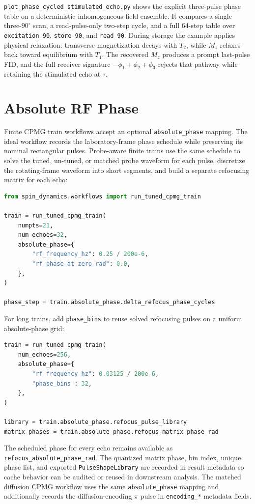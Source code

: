 \documentclass[11pt,oneside]{report}
\newcommand{\code}[1]{\texttt{#1}}
\begin{document}
\code{plot\_phase\_cycled\_stimulated\_echo.py} shows the explicit three-pulse
phase table on a deterministic inhomogeneous-field ensemble. It compares a
single three-\(90^\circ\) scan, a read-pulse-only two-step cycle, and a full
64-step table over \code{excitation\_90}, \code{store\_90}, and
\code{read\_90}. During storage the example applies physical relaxation:
transverse magnetization decays with \(T_2\), while \(M_z\) relaxes back toward
equilibrium with \(T_1\). The recovered \(M_z\) produces a prompt last-pulse
FID, and the full receiver signature \(-\phi_1+\phi_2+\phi_3\) rejects that
pathway while retaining the stimulated echo at \(\tau\).

\section{Absolute RF Phase}

Finite CPMG train workflows accept an optional \code{absolute\_phase}
mapping.  The ideal workflow records the laboratory-frame phase schedule while
preserving its nominal rectangular pulses.  Probe-aware finite trains use the
same schedule to solve the tuned, un-tuned, or matched probe waveform for each
pulse, discretize the rotating-frame waveform into short segments, and build a
separate refocusing matrix for each echo:

\begin{lstlisting}[language=Python]
from spin_dynamics.workflows import run_tuned_cpmg_train

train = run_tuned_cpmg_train(
    numpts=21,
    num_echoes=32,
    absolute_phase={
        "rf_frequency_hz": 0.25 / 200e-6,
        "rf_phase_at_zero_rad": 0.0,
    },
)

phase_step = train.absolute_phase.delta_refocus_phase_cycles
\end{lstlisting}

For long trains, add \code{phase\_bins} to reuse solved refocusing pulses on a
uniform absolute-phase grid:

\begin{lstlisting}[language=Python]
train = run_tuned_cpmg_train(
    num_echoes=256,
    absolute_phase={
        "rf_frequency_hz": 0.03125 / 200e-6,
        "phase_bins": 32,
    },
)

library = train.absolute_phase.refocus_pulse_library
matrix_phases = train.absolute_phase.refocus_matrix_phase_rad
\end{lstlisting}

The scheduled phase for every echo remains available as
\code{refocus\_absolute\_phase\_rad}.  The quantized matrix phase, bin index,
unique phase list, and exported \code{PulseShapeLibrary} are recorded in result
metadata so cache behavior can be audited or reused in downstream analysis.
The matched diffusion CPMG workflow uses the same \code{absolute\_phase}
mapping and additionally records the diffusion-encoding \(\pi\) pulse in
\code{encoding\_*} metadata fields.
\end{document}
